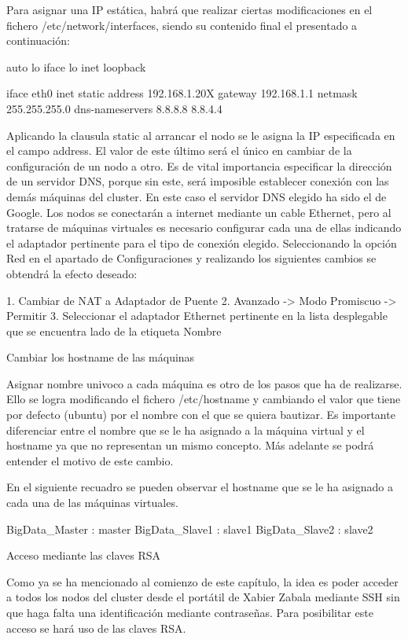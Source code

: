 Para asignar una IP estática, habrá que realizar ciertas modificaciones en el fichero /etc/network/interfaces, siendo su contenido final el presentado a continuación:

auto lo
iface lo inet loopback

iface eth0 inet static
address 192.168.1.20X
gateway 192.168.1.1
netmask 255.255.255.0
dns-nameservers 8.8.8.8 8.8.4.4

Aplicando la clausula static al arrancar el nodo se le asigna la IP especificada en el campo address. El valor de este último será el único en cambiar  de la configuración de un nodo a otro. Es de vital importancia especificar la dirección de un servidor DNS, porque sin este, será imposible establecer conexión con las demás máquinas del cluster. En este caso el servidor DNS elegido ha sido el de Google. 
Los nodos se conectarán a internet mediante un cable Ethernet, pero al tratarse de máquinas virtuales es necesario configurar cada una de ellas indicando el adaptador pertinente para el tipo de conexión elegido. Seleccionando la opción Red en el apartado de Configuraciones y realizando los siguientes cambios se obtendrá la efecto deseado:

1.	Cambiar de NAT a Adaptador de Puente
2.	Avanzado -> Modo Promiscuo -> Permitir
3.	Seleccionar el adaptador Ethernet pertinente en la lista desplegable que se encuentra lado de la etiqueta Nombre 

Cambiar los hostname de las máquinas

Asignar nombre univoco a cada máquina es otro de los pasos que ha de realizarse. Ello se logra modificando el fichero /etc/hostname y cambiando el valor que tiene por defecto (ubuntu) por el nombre con el que se quiera bautizar. Es importante diferenciar entre el nombre que se le ha asignado a la máquina virtual y el hostname ya que no representan un mismo concepto. Más adelante se podrá entender el motivo de este cambio.

En el siguiente recuadro se pueden observar el hostname que se le ha asignado a cada una de las máquinas virtuales.

BigData_Master : master
BigData_Slave1 : slave1
BigData_Slave2 : slave2

Acceso mediante las claves RSA

Como ya se ha mencionado al comienzo de este capítulo, la idea es poder acceder a todos los nodos del cluster desde el portátil de Xabier Zabala mediante SSH sin que haga falta una identificación mediante contraseñas. Para posibilitar este acceso se hará uso de las claves RSA.

